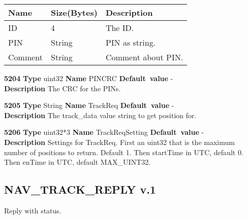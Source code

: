 \documentclass[a4paper]{article}
\begin{document}
\begin{list}{\textbf{ParamID}}{}
  \begin{tabular}{|l|l|p{60mm}|}
    \hline
    Name    & Size(Bytes) & Description \\\hline
    ID      & 4           & The ID. \\\hline
    PIN     & String      & PIN as string. \\\hline
    Comment & String      & Comment about PIN. \\\hline
  \end{tabular}
\item \textbf{5204} \textbf{Type} uint32 \textbf{Name} PINCRC
                 \textbf{Default~value} - \\
  \label{track_req:PINCRC}
  \textbf{Description} The CRC for the PINs.
\item \textbf{5205} \textbf{Type} String \textbf{Name} TrackReq
                 \textbf{Default~value} - \\
  \label{TrackReq}
  \textbf{Description} The track\_data value string to get position for.
\item \textbf{5206} \textbf{Type} uint32*3 \textbf{Name} TrackReqSetting
                 \textbf{Default~value} - \\
  \label{TrackReqSetting}
  \textbf{Description} Settings for TrackReq. First an uint32 that is the
                       maximum number of positions to return. Default 1.
                       Then startTime in UTC, default 0.
                       Then enTime in UTC, default MAX\_UINT32.
\end{list}



\subsection{NAV\_TRACK\_REPLY v.1}
\label{NAV_TRACK_REPLY}

Reply with status.
\end{document}
